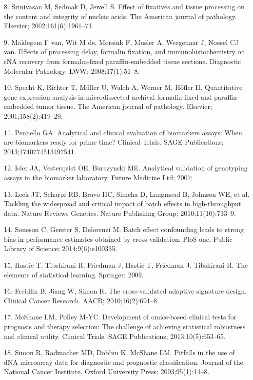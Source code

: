 \documentclass[11pt]{article}
\begin{document}
8. Srinivasan M, Sedmak D, Jewell S. Effect of fixatives and tissue
processing on the content and integrity of nucleic acids. The American
journal of pathology. Elsevier; 2002;161(6):1961--71.

9. Maldegem F van, Wit M de, Morsink F, Musler A, Weegenaar J, Noesel CJ
van. Effects of processing delay, formalin fixation, and
immunohistochemistry on rNA recovery from formalin-fixed
paraffin-embedded tissue sections. Diagnostic Molecular Pathology. LWW;
2008;17(1):51--8.

10. Specht K, Richter T, M{ü}ller U, Walch A, Werner M, H{ö}fler H.
Quantitative gene expression analysis in microdissected archival
formalin-fixed and paraffin-embedded tumor tissue. The American journal
of pathology. Elsevier; 2001;158(2):419--29.

11. Pennello GA. Analytical and clinical evaluation of biomarkers
assays: When are biomarkers ready for prime time? Clinical Trials. SAGE
Publications; 2013;1740774513497541.

12. Isler JA, Vesterqvist OE, Burczynski ME. Analytical validation of
genotyping assays in the biomarker laboratory. Future Medicine Ltd;
2007;

13. Leek JT, Scharpf RB, Bravo HC, Simcha D, Langmead B, Johnson WE, et
al. Tackling the widespread and critical impact of batch effects in
high-throughput data. Nature Reviews Genetics. Nature Publishing Group;
2010;11(10):733--9.

14. Soneson C, Gerster S, Delorenzi M. Batch effect confounding leads to
strong bias in performance estimates obtained by cross-validation. PloS
one. Public Library of Science; 2014;9(6):e100335.

15. Hastie T, Tibshirani R, Friedman J, Hastie T, Friedman J, Tibshirani
R. The elements of statistical learning. Springer; 2009.

16. Freidlin B, Jiang W, Simon R. The cross-validated adaptive signature
design. Clinical Cancer Research. AACR; 2010;16(2):691--8.

17. McShane LM, Polley M-YC. Development of omics-based clinical tests
for prognosis and therapy selection: The challenge of achieving
statistical robustness and clinical utility. Clinical Trials. SAGE
Publications; 2013;10(5):653--65.

18. Simon R, Radmacher MD, Dobbin K, McShane LM. Pitfalls in the use of
dNA microarray data for diagnostic and prognostic classification.
Journal of the National Cancer Institute. Oxford University Press;
2003;95(1):14--8.
\end{document}

